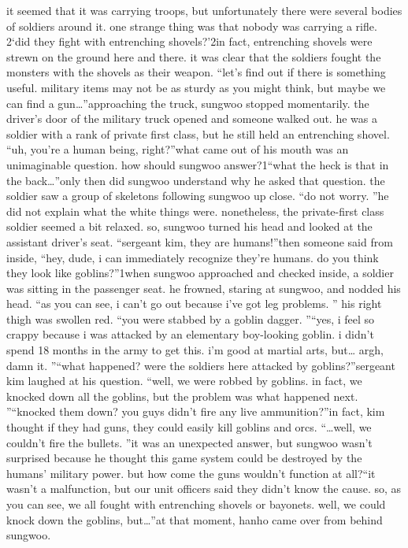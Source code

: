 it seemed that it was carrying troops, but unfortunately there were several bodies of soldiers around it.
 one strange thing was that nobody was carrying a rifle.
2‘did they fight with entrenching shovels?’2in fact, entrenching shovels were strewn on the ground here and there.
 it was clear that the soldiers fought the monsters with the shovels as their weapon.
“let’s find out if there is something useful.
 military items may not be as sturdy as you might think, but maybe we can find a gun…”approaching the truck, sungwoo stopped momentarily.
 the driver’s door of the military truck opened and someone walked out.
 he was a soldier with a rank of private first class, but he still held an entrenching shovel.
“uh, you’re a human being, right?”what came out of his mouth was an unimaginable question.
how should sungwoo answer?1“what the heck is that in the back…”only then did sungwoo understand why he asked that question.
 the soldier saw a group of skeletons following sungwoo up close.
“do not worry.
”he did not explain what the white things were.
 nonetheless, the private-first class soldier seemed a bit relaxed.
 so, sungwoo turned his head and looked at the assistant driver’s seat.
“sergeant kim, they are humans!”then someone said from inside, “hey, dude, i can immediately recognize they’re humans.
 do you think they look like goblins?”1when sungwoo approached and checked inside, a soldier was sitting in the passenger seat.
he frowned, staring at sungwoo, and nodded his head.
“as you can see, i can’t go out because i’ve got leg problems.
”
his right thigh was swollen red.
“you were stabbed by a goblin dagger.
”“yes, i feel so crappy because i was attacked by an elementary boy-looking goblin.
 i didn’t spend 18 months in the army to get this.
 i’m good at martial arts, but… argh, damn it.
”“what happened? were the soldiers here attacked by goblins?”sergeant kim laughed at his question.
“well, we were robbed by goblins.
 in fact, we knocked down all the goblins, but the problem was what happened next.
”“knocked them down? you guys didn’t fire any live ammunition?”in fact, kim thought if they had guns, they could easily kill goblins and orcs.
“…well, we couldn’t fire the bullets.
”it was an unexpected answer, but sungwoo wasn’t surprised because he thought this game system could be destroyed by the humans’ military power.
 but how come the guns wouldn’t function at all?“it wasn’t a malfunction, but our unit officers said they didn’t know the cause.
 so, as you can see, we all fought with entrenching shovels or bayonets.
 well, we could knock down the goblins, but…”at that moment, hanho came over from behind sungwoo.
